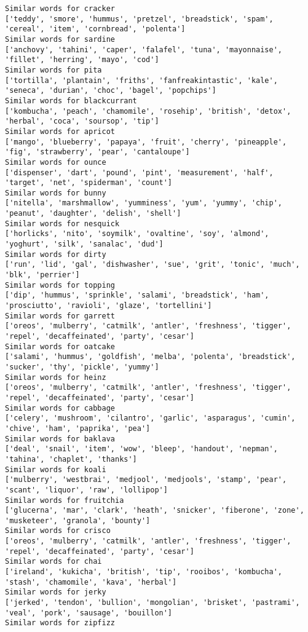 \documentclass[11pt]{article}
\begin{document}
\begin{Verbatim}[commandchars=\\\{\}]
Similar words for cracker
['teddy', 'smore', 'hummus', 'pretzel', 'breadstick', 'spam', 'cereal', 'item', 'cornbread', 'polenta']
Similar words for sardine
['anchovy', 'tahini', 'caper', 'falafel', 'tuna', 'mayonnaise', 'fillet', 'herring', 'mayo', 'cod']
Similar words for pita
['tortilla', 'plantain', 'friths', 'fanfreakintastic', 'kale', 'seneca', 'durian', 'choc', 'bagel', 'popchips']
Similar words for blackcurrant
['kombucha', 'peach', 'chamomile', 'rosehip', 'british', 'detox', 'herbal', 'coca', 'soursop', 'tip']
Similar words for apricot
['mango', 'blueberry', 'papaya', 'fruit', 'cherry', 'pineapple', 'fig', 'strawberry', 'pear', 'cantaloupe']
Similar words for ounce
['dispenser', 'dart', 'pound', 'pint', 'measurement', 'half', 'target', 'net', 'spiderman', 'count']
Similar words for bunny
['nitella', 'marshmallow', 'yumminess', 'yum', 'yummy', 'chip', 'peanut', 'daughter', 'delish', 'shell']
Similar words for nesquick
['horlicks', 'nito', 'soymilk', 'ovaltine', 'soy', 'almond', 'yoghurt', 'silk', 'sanalac', 'dud']
Similar words for dirty
['run', 'lid', 'gal', 'dishwasher', 'sue', 'grit', 'tonic', 'much', 'blk', 'perrier']
Similar words for topping
['dip', 'hummus', 'sprinkle', 'salami', 'breadstick', 'ham', 'prosciutto', 'ravioli', 'glaze', 'tortellini']
Similar words for garrett
['oreos', 'mulberry', 'catmilk', 'antler', 'freshness', 'tigger', 'repel', 'decaffeinated', 'party', 'cesar']
Similar words for oatcake
['salami', 'hummus', 'goldfish', 'melba', 'polenta', 'breadstick', 'sucker', 'thy', 'pickle', 'yummy']
Similar words for heinz
['oreos', 'mulberry', 'catmilk', 'antler', 'freshness', 'tigger', 'repel', 'decaffeinated', 'party', 'cesar']
Similar words for cabbage
['celery', 'mushroom', 'cilantro', 'garlic', 'asparagus', 'cumin', 'chive', 'ham', 'paprika', 'pea']
Similar words for baklava
['deal', 'snail', 'item', 'wow', 'bleep', 'handout', 'nepman', 'tahina', 'chaplet', 'thanks']
Similar words for koali
['mulberry', 'westbrai', 'medjool', 'medjools', 'stamp', 'pear', 'scant', 'liquor', 'raw', 'lollipop']
Similar words for fruitchia
['glucerna', 'mar', 'clark', 'heath', 'snicker', 'fiberone', 'zone', 'musketeer', 'granola', 'bounty']
Similar words for crisco
['oreos', 'mulberry', 'catmilk', 'antler', 'freshness', 'tigger', 'repel', 'decaffeinated', 'party', 'cesar']
Similar words for chai
['ireland', 'kukicha', 'british', 'tip', 'rooibos', 'kombucha', 'stash', 'chamomile', 'kava', 'herbal']
Similar words for jerky
['jerked', 'tendon', 'bullion', 'mongolian', 'brisket', 'pastrami', 'veal', 'pork', 'sausage', 'bouillon']
Similar words for zipfizz

\end{Verbatim}
\end{document}
